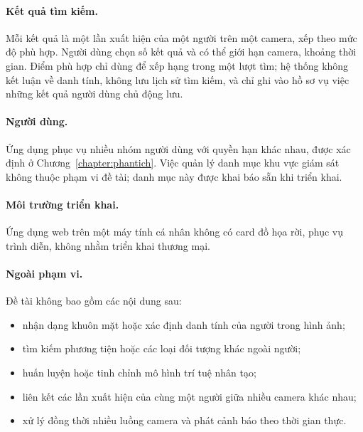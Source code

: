 \paragraph{Kết quả tìm kiếm.} Mỗi kết quả là một lần xuất hiện của một người trên một camera, xếp theo mức độ phù hợp. Người dùng chọn số kết quả và có thể giới hạn camera, khoảng thời gian. Điểm phù hợp chỉ dùng để xếp hạng trong một lượt tìm; hệ thống không kết luận về danh tính, không lưu lịch sử tìm kiếm, và chỉ ghi vào hồ sơ vụ việc những kết quả người dùng chủ động lưu.

\paragraph{Người dùng.} Ứng dụng phục vụ nhiều nhóm người dùng với quyền hạn khác nhau, được xác định ở Chương~\ref{chapter:phantich}. Việc quản lý danh mục khu vực giám sát không thuộc phạm vi đề tài; danh mục này được khai báo sẵn khi triển khai.

\paragraph{Môi trường triển khai.} Ứng dụng web trên một máy tính cá nhân không có card đồ họa rời, phục vụ trình diễn, không nhằm triển khai thương mại.

\paragraph{Ngoài phạm vi.} Đề tài không bao gồm các nội dung sau:
\begin{itemize}
    \item nhận dạng khuôn mặt hoặc xác định danh tính của người trong hình ảnh;
    \item tìm kiếm phương tiện hoặc các loại đối tượng khác ngoài người;
    \item huấn luyện hoặc tinh chỉnh mô hình trí tuệ nhân tạo;
    \item liên kết các lần xuất hiện của cùng một người giữa nhiều camera khác nhau;
    \item xử lý đồng thời nhiều luồng camera và phát cảnh báo theo thời gian thực.
\end{itemize}
